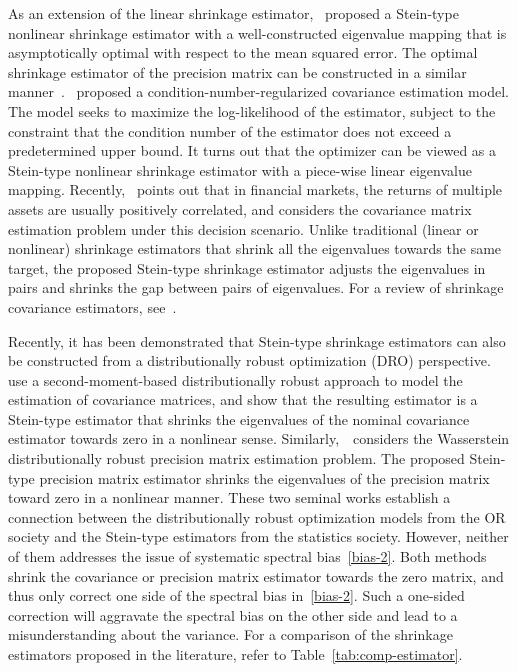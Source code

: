 \documentclass[11pt]{article}
\begin{document}
As an extension of the linear shrinkage estimator,~\cite{ref:Ledoit2012,ref:LedoitWolfNonlinear} proposed a Stein-type nonlinear shrinkage estimator with a well-constructed eigenvalue mapping that is asymptotically optimal with respect to the mean squared error. The optimal shrinkage estimator of the precision matrix can be constructed in a similar manner~\citep{ref:BODNAR2016223,ref:ledoit2022quadratic}.~\cite{ref:condition2012won} proposed a condition-number-regularized covariance estimation model. The model seeks to maximize the log-likelihood of the estimator, subject to the constraint that the condition number of the estimator does not exceed a predetermined upper bound. It turns out that the optimizer can be viewed as a Stein-type nonlinear shrinkage estimator with a piece-wise linear eigenvalue mapping. Recently,~\cite{ref:liu2025covariance} points out that in financial markets, the returns of multiple assets are usually positively correlated, and considers the covariance matrix estimation problem under this decision scenario. Unlike traditional (linear or nonlinear) shrinkage estimators that shrink all the eigenvalues towards the same target, the proposed Stein-type shrinkage estimator adjusts the eigenvalues in pairs and shrinks the gap between pairs of eigenvalues.
For a review of shrinkage covariance estimators, see~\cite{ref:10.1093/jjfinec/nbaa007}.




Recently, it has been demonstrated that Stein-type shrinkage estimators can also be constructed from a distributionally robust optimization (DRO) perspective. \cite{ref:yue2024geometric} use a second-moment-based distributionally robust approach to model the estimation of covariance matrices, and show that the resulting estimator is a Stein-type estimator that shrinks the eigenvalues of the nominal covariance estimator towards zero in a nonlinear sense. Similarly,~\cite{ref:nguyen2022distributionally}~considers the Wasserstein distributionally robust precision matrix estimation problem. The proposed Stein-type precision matrix estimator shrinks the eigenvalues of the precision matrix toward zero in a nonlinear manner. 
These two seminal works establish a connection between the distributionally robust optimization models from the OR society and the Stein-type estimators from the statistics society. 
However, neither of them addresses the issue of systematic spectral bias~\eqref{bias-2}. Both methods shrink the covariance or precision matrix estimator towards the zero matrix, and thus only correct one side of the spectral bias in~\eqref{bias-2}. Such a one-sided correction will aggravate the spectral bias on the other side and lead to a misunderstanding about the variance. For a comparison of the shrinkage estimators proposed in the literature, refer to Table~\ref{tab:comp-estimator}.
\end{document}
